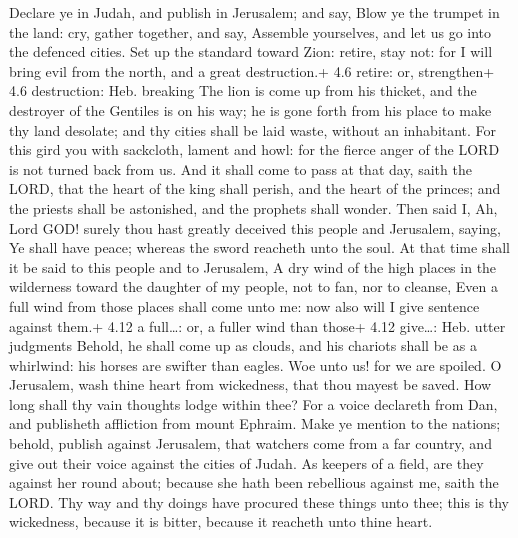  Declare ye in Judah, and publish in Jerusalem; and say,
Blow ye the trumpet in the land: cry, gather together, and say, Assemble
yourselves, and let us go into the defenced cities.  Set up
the standard toward Zion: retire, stay not: for I will bring evil from
the north, and a great destruction.+ 4.6 retire: or, strengthen+ 4.6
destruction: Heb. breaking  The lion is come up from his
thicket, and the destroyer of the Gentiles is on his way; he is gone
forth from his place to make thy land desolate; and thy cities shall be
laid waste, without an inhabitant.  For this gird you with
sackcloth, lament and howl: for the fierce anger of the LORD is not
turned back from us.  And it shall come to pass at that day,
saith the LORD, that the heart of the king shall perish, and the heart
of the princes; and the priests shall be astonished, and the prophets
shall wonder.  Then said I, Ah, Lord GOD! surely thou hast
greatly deceived this people and Jerusalem, saying, Ye shall have peace;
whereas the sword reacheth unto the soul.  At that time
shall it be said to this people and to Jerusalem, A dry wind of the high
places in the wilderness toward the daughter of my people, not to fan,
nor to cleanse,  Even a full wind from those places shall
come unto me: now also will I give sentence against them.+ 4.12 a
full\ldots: or, a fuller wind than those+ 4.12 give\ldots: Heb. utter
judgments  Behold, he shall come up as clouds, and his
chariots shall be as a whirlwind: his horses are swifter than eagles.
Woe unto us! for we are spoiled.  O Jerusalem, wash thine
heart from wickedness, that thou mayest be saved. How long shall thy
vain thoughts lodge within thee?  For a voice declareth
from Dan, and publisheth affliction from mount Ephraim. 
Make ye mention to the nations; behold, publish against Jerusalem, that
watchers come from a far country, and give out their voice against the
cities of Judah.  As keepers of a field, are they against
her round about; because she hath been rebellious against me, saith the
LORD.  Thy way and thy doings have procured these things
unto thee; this is thy wickedness, because it is bitter, because it
reacheth unto thine heart.

